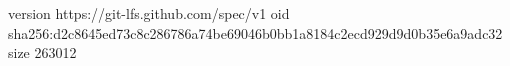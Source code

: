version https://git-lfs.github.com/spec/v1
oid sha256:d2c8645ed73c8c286786a74be69046b0bb1a8184c2ecd929d9d0b35e6a9adc32
size 263012
